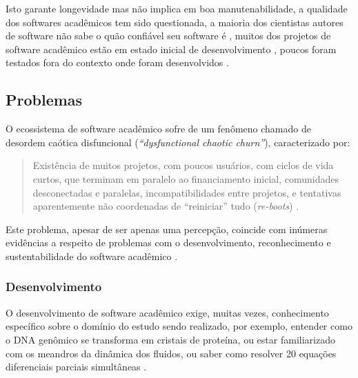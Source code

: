 Isto garante longevidade mas não implica em boa manutenabilidade, a qualidade
dos softwares acadêmicos tem sido questionada, a maioria dos cientistas autores
de software não sabe o quão confiável seu software é
\cite{merali2010computational}, muitos dos projetos de software acadêmico estão
em estado inicial de desenvolvimento \cite{marshall2013tools}, poucos foram
testados fora do contexto onde foram desenvolvidos \cite{portillo2012tools}.

\subsection{Problemas}


O ecossistema de software acadêmico sofre de um fenômeno chamado de  
desordem caótica disfuncional ({\it ``dysfunctional chaotic
churn''}), caracterizado por:

\begin{quote}
Existência de muitos projetos, com poucos usuários, com
ciclos de vida curtos, que terminam em paralelo ao financiamento inicial,
comunidades desconectadas e paralelas, incompatibilidades entre projetos, e
tentativas aparentemente não coordenadas de ``reiniciar'' tudo ({\it re-boots})
\cite{howison2015understanding}.
\end{quote}

Este problema, apesar de ser apenas uma percepção, coincide com inúmeras
evidências a respeito de problemas com o desenvolvimento, reconhecimento e
sustentabilidade do software acadêmico \cite{allen2017engineering}.


\subsubsection{Desenvolvimento}

O desenvolvimento de software acadêmico exige, muitas vezes, conhecimento
específico sobre o domínio do estudo sendo realizado,
por exemplo, entender como o DNA genômico
se transforma em cristais de proteína, ou estar familiarizado com os meandros
da dinâmica dos fluidos, ou saber como resolver 20 equações diferenciais
parciais simultâneas \cite{segal2008developing}.

